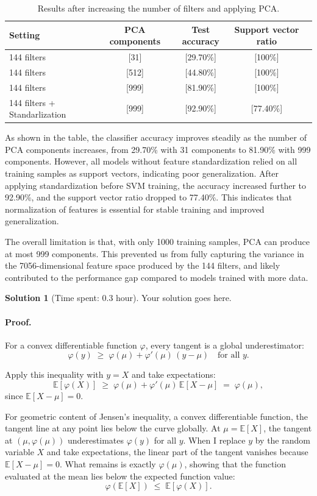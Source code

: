 \documentclass[11pt, reqno, letterpaper, twoside]{amsart}
\theoremstyle{plain}
\theoremstyle{definition}
\newtheorem{solution}[theorem]{Solution}
\begin{document}
\begin{table}[H]
\centering
\begin{tabular}{lcccc}
\hline
Setting  & PCA components &  Test accuracy  &  Support vector ratio\\
\hline
144 filters   & [31] & [29.70\%] & [100\%]\\
144 filters   & [512] &  [44.80\%] &  [100\%]\\
144 filters   & [999] &  [81.90\%]  &  [100\%]\\
144 filters  + Standarlization& [999] &  [92.90\%]  &  [77.40\%]\\
\hline
\end{tabular}
\caption{Results after increasing the number of filters and applying PCA.}
\label{tab:pca-results}
\end{table}

As shown in the table, the classifier accuracy improves steadily as the number of 
PCA components increases, from 29.70\% with 31 components to 81.90\% with 999 
components. However, all models without feature standardization relied on all 
training samples as support vectors, indicating poor generalization. After applying 
standardization before SVM training, the accuracy increased further to 92.90\%, and 
the support vector ratio dropped to 77.40\%. This indicates that normalization of 
features is essential for stable training and improved generalization.

The overall limitation is that, with only 1000 training samples, PCA can produce 
at most 999 components. This prevented us from fully capturing the variance in 
the 7056-dimensional feature space produced by the 144 filters, and likely 
contributed to the performance gap compared to models trained with more data.

\clearpage
\begin{solution}[Time spent: 0.3 hour]
Your solution goes here.\\
\paragraph{Proof.}
For a convex differentiable function $\varphi$, every tangent is a global underestimator:
\[
\varphi(y) \;\geq\; \varphi(\mu) + \varphi'(\mu)\,(y-\mu) \quad \text{for all } y.
\]

Apply this inequality with $y = X$ and take expectations:
\[
\mathbb{E}[\varphi(X)] 
\;\geq\; \varphi(\mu) + \varphi'(\mu)\,\mathbb{E}[X-\mu]
\;=\; \varphi(\mu),
\]
since $\mathbb{E}[X-\mu] = 0$.


For geometric content of Jensen's inequality, a convex differentiable function, the tangent line at any point lies below the curve globally. 
At $\mu = \mathbb{E}[X]$, the tangent at $(\mu, \varphi(\mu))$ underestimates $\varphi(y)$ for all $y$. 
When I replace $y$ by the random variable $X$ and take expectations, the linear part of the tangent vanishes 
because $\mathbb{E}[X-\mu] = 0$. What remains is exactly $\varphi(\mu)$, showing that the function evaluated 
at the mean lies below the expected function value:
\[
\varphi(\mathbb{E}[X]) \;\leq\; \mathbb{E}[\varphi(X)].
\]

\end{solution}
\end{document}
